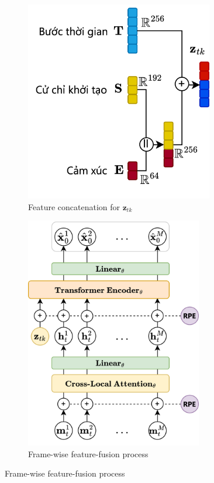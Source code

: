 \begin{figure}[h]
	\centering
	\begin{subfigure}{0.42\textwidth}
		\centering
		\includegraphics[width=0.9\textwidth]{images/FeatureConcatenate}
		\caption{Feature concatenation for $\mathbf{z}_{tk}$}
		\label{fig:FeatureFusion}
	\end{subfigure}
	\hfill
	\begin{subfigure}{0.55\textwidth}
		\centering
		\includegraphics[width=0.85\textwidth]{images/FeatureFusion}
		\caption{Frame-wise feature-fusion process}
		\label{fig:ZToken}
	\end{subfigure}
\end{figure}

